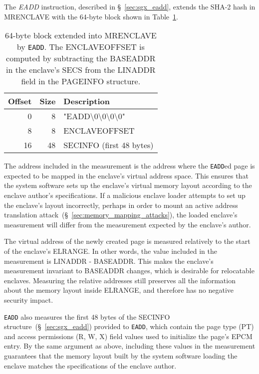 The \textit{EADD} instruction, described in \S~\ref{sec:sgx_eadd}, extends the
SHA-2 hash in MRENCLAVE with the 64-byte block shown in
Table~\ref{fig:eadd_mrenclave}.

\begin{table}[hbt]
  \centering
  \begin{tabularx}{\columnwidth}{| r | r | X |}
  \hline
  \textbf{Offset} & \textbf{Size} & \textbf{Description}\\
  \hline
  0 & 8 &
  "EADD\textbackslash{}0\textbackslash{}0\textbackslash{}0\textbackslash{}0" \\
  \hline
  8 & 8 & ENCLAVEOFFSET \\
  \hline
  16 & 48 & SECINFO (first 48 bytes) \\
  \hline
  \end{tabularx}
  \caption{
    64-byte block extended into MRENCLAVE by \texttt{EADD}. The ENCLAVEOFFSET
    is computed by subtracting the BASEADDR in the enclave's SECS from the
    LINADDR field in the PAGEINFO structure.
  }
  \label{fig:eadd_mrenclave}
\end{table}

The address included in the measurement is the address where the
\texttt{EADD}ed page is expected to be mapped in the enclave's virtual address
space. This ensures that the system software sets up the enclave's virtual
memory layout according to the enclave author's specifications. If a malicious
enclave loader attempts to set up the enclave's layout incorrectly, perhaps in
order to mount an active address translation
attack~(\S~\ref{sec:memory_mapping_attacks}), the loaded enclave's measurement
will differ from the measurement expected by the enclave's author.

The virtual address of the newly created page is measured relatively to the
start of the enclave's ELRANGE. In other words, the value included in the
measurement is LINADDR - BASEADDR. This makes the enclave's measurement
invariant to BASEADDR changes, which is desirable for relocatable enclaves.
Measuring the relative addresses still preserves all the information about the
memory layout inside ELRANGE, and therefore has no negative security impact.

\texttt{EADD} also measures the first 48 bytes of the SECINFO
structure~(\S~\ref{sec:sgx_eadd}) provided to \texttt{EADD}, which contain the
page type (PT) and access permissions (R, W, X) field values used to initialize
the page's EPCM entry. By the same argument as above, including these values in
the measurement guarantees that the memory layout built by the system software
loading the enclave matches the specifications of the enclave author.

